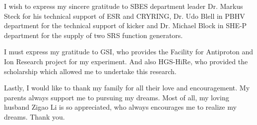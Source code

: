 I wish to express my sincere gratitude to \gls{SBES} department leader Dr. Markus Steck for his technical support of ESR and CRYRING, Dr. Udo Blell in \gls{PBHV} department for the technical support of kicker and Dr. Michael Block in \gls{SHE-P} department for the supply of two SRS function generators. 

I must express my gratitude to GSI, who provides the Facility for Antiproton and Ion Research project for my experiment. And also HGS-HiRe, who provided the scholarship which allowed me to undertake this research.


Lastly, I would like to thank my family for all their love and encouragement. My parents always support me to pursuing my dreams. Most of all, my loving husband Zigao Li is so appreciated, who always encourages me to realize my dreams. Thank you.





